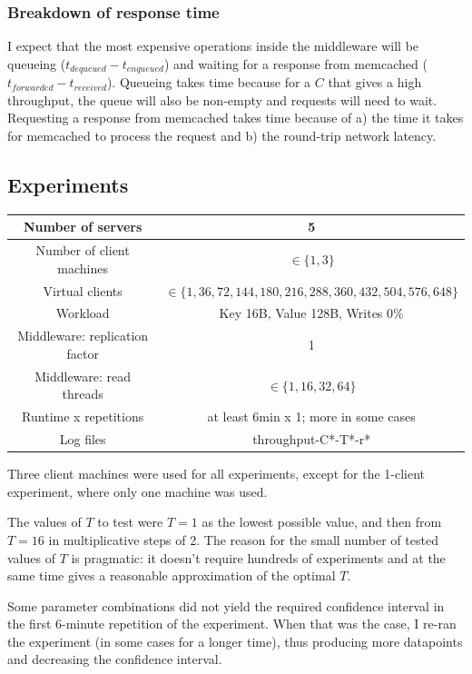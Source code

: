\documentclass[11pt]{article}
\begin{document}
\subsubsection{Breakdown of response time}
I expect that the most expensive operations inside the middleware will be queueing ($t_{dequeued}-t_{enqueued}$) and waiting for a response from memcached ($t_{forwarded}-t_{received}$). Queueing takes time because for a $C$ that gives a high throughput, the queue will also be non-empty and requests will need to wait. Requesting a response from memcached takes time because of a) the time it takes for memcached to process the request and b) the round-trip network latency.

\subsection{Experiments}
\begin{center}
\small{
\smallskip
\begin{tabular}{|c|c|}
\hline Number of servers & 5 \\ 
\hline Number of client machines & $\in \{1, 3\}$ \\ 
\hline Virtual clients & $\in \{1, 36, 72, 144, 180, 216, 288, 360, 432, 504, 576, 648\}$ \\ 
\hline Workload & Key 16B, Value 128B, Writes 0\% \\
\hline Middleware: replication factor & 1 \\ 
\hline Middleware: read threads & $\in\{1, 16, 32, 64\}$ \\ 
\hline Runtime x repetitions & at least 6min x 1; more in some cases \\ 
\hline Log files & throughput-C*-T*-r* \\
\hline 
\end{tabular} }
\end{center}

Three client machines were used for all experiments, except for the 1-client experiment, where only one machine was used.

The values of $T$ to test were $T=1$ as the lowest possible value, and then from $T=16$ in multiplicative steps of 2. The reason for the small number of tested values of $T$ is pragmatic: it doesn't require hundreds of experiments and at the same time gives a reasonable approximation of the optimal $T$.

Some parameter combinations did not yield the required confidence interval in the first 6-minute repetition of the experiment. When that was the case, I re-ran the experiment (in some cases for a longer time), thus producing more datapoints and decreasing the confidence interval.
\end{document}
